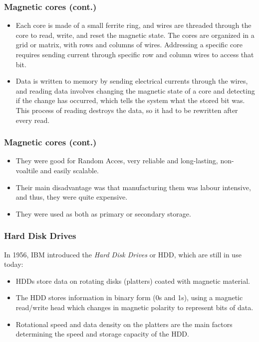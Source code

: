 \documentclass[aspectratio=169]{beamer}
\begin{document}
\begin{frame}
  \frametitle{Magnetic cores (cont.)}
  \begin{itemize}
    \item Each core is made of a small ferrite ring, and wires are threaded through the core to read, write, and reset the magnetic state. The cores are organized in a grid or matrix, with rows and columns of wires. Addressing a specific core requires sending current through specific row and column wires to access that bit. \pause
    \item Data is written to memory by sending electrical currents through the wires, and reading data involves changing the magnetic state of a core and detecting if the change has occurred, which tells the system what the stored bit was. This process of reading destroys the data, so it had to be rewritten after every read. 
  \end{itemize}
\end{frame}


\begin{frame}
  \frametitle{Magnetic cores (cont.)}
  \begin{itemize}
    \item They were good for Random Acces, very reliable and long-lasting, non-voaltile and easily scalable. \pause 
    \item Their main disadvantage was that manufacturing them was labour intensive, and thus, they were quite expensive. \pause
    \item They were used as both as primary or secondary storage.
  \end{itemize}
\end{frame}


\begin{frame}
  \frametitle{Hard Disk Drives}
  In 1956, IBM introduced the \textit{Hard Disk Drives} or HDD, which are still in use today: \pause
  \begin{itemize}
    \item HDDs store data on rotating disks (platters) coated with magnetic material. \pause
    \item The HDD stores information in binary form (0s and 1s), using a magnetic read/write head which changes in magnetic polarity to represent bits of data. \pause
    \item Rotational speed and data density on the platters are the main factors determining the speed and storage capacity of the HDD. \pause
  \end{itemize}
\end{frame}
\end{document}
